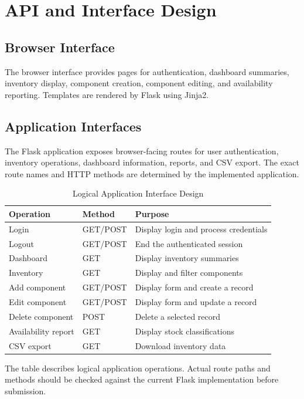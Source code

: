 \documentclass[conference]{IEEEtran}
\begin{document}
\section{API and Interface Design}

\subsection{Browser Interface}
The browser interface provides pages for authentication, dashboard summaries, inventory display, component creation, component editing, and availability reporting. Templates are rendered by Flask using Jinja2.

\subsection{Application Interfaces}
The Flask application exposes browser-facing routes for user authentication, inventory operations, dashboard information, reports, and CSV export. The exact route names and HTTP methods are determined by the implemented application.

\begin{table}[!t]
\caption{Logical Application Interface Design}
\label{tab:api}
\centering
\small
\begin{tabularx}{\columnwidth}{l l Y}
\toprule
\textbf{Operation} & \textbf{Method} & \textbf{Purpose}\\
\midrule
Login & GET/POST & Display login and process credentials\\
Logout & GET/POST & End the authenticated session\\
Dashboard & GET & Display inventory summaries\\
Inventory & GET & Display and filter components\\
Add component & GET/POST & Display form and create a record\\
Edit component & GET/POST & Display form and update a record\\
Delete component & POST & Delete a selected record\\
Availability report & GET & Display stock classifications\\
CSV export & GET & Download inventory data\\
\bottomrule
\end{tabularx}
\end{table}

The table describes logical application operations. Actual route paths and methods should be checked against the current Flask implementation before submission.
\end{document}
